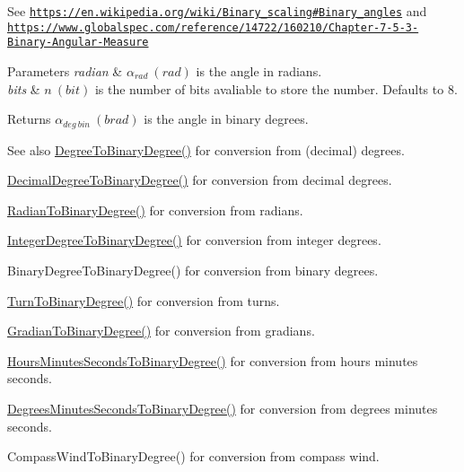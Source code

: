 See \href{https://en.wikipedia.org/wiki/Binary_scaling#Binary_angles}{\tt https\+://en.\+wikipedia.\+org/wiki/\+Binary\+\_\+scaling\#\+Binary\+\_\+angles} and \href{https://www.globalspec.com/reference/14722/160210/Chapter-7-5-3-Binary-Angular-Measure}{\tt https\+://www.\+globalspec.\+com/reference/14722/160210/\+Chapter-\/7-\/5-\/3-\/\+Binary-\/\+Angular-\/\+Measure} 
\begin{DoxyParams}{Parameters}
{\em radian} & $\alpha_{rad}\ (rad)$ is the angle in radians. \\
\hline
{\em bits} & $n\ (bit)$ is the number of bits avaliable to store the number. Defaults to 8. \\
\hline
\end{DoxyParams}
\begin{DoxyReturn}{Returns}
$\alpha_{deg\ bin}\ (brad)$ is the angle in binary degrees. 
\end{DoxyReturn}
\begin{DoxySeeAlso}{See also}
\mbox{\hyperlink{group___e_g_x_math-_angle_conversions-_degree_gacd1e3dc5194e89426a899a7cac4874f8}{Degree\+To\+Binary\+Degree()}} for conversion from (decimal) degrees. 

\mbox{\hyperlink{group___e_g_x_math-_angle_conversions-_decimal_degree_gaceec7ae7988c7f342d0b0fa6940720a1}{Decimal\+Degree\+To\+Binary\+Degree()}} for conversion from decimal degrees. 

\mbox{\hyperlink{group___e_g_x_math-_angle_conversions-_radian_ga13311d9b6977d514f1d6c336e7c0162b}{Radian\+To\+Binary\+Degree()}} for conversion from radians. 

\mbox{\hyperlink{group___e_g_x_math-_angle_conversions-_integer_degree_ga694bbfe624c3c14e97ce6155ca9bc44d}{Integer\+Degree\+To\+Binary\+Degree()}} for conversion from integer degrees. 

Binary\+Degree\+To\+Binary\+Degree() for conversion from binary degrees. 

\mbox{\hyperlink{group___e_g_x_math-_angle_conversions-_turn_ga678efb8f5c3958351fc3f1dfaf117b28}{Turn\+To\+Binary\+Degree()}} for conversion from turns. 

\mbox{\hyperlink{group___e_g_x_math-_angle_conversions-_gradian_ga6bf31920148bfd61f1f06eb961c3f62b}{Gradian\+To\+Binary\+Degree()}} for conversion from gradians. 

\mbox{\hyperlink{group___e_g_x_math-_angle_conversions-_hours_minutes_seconds_ga962a367fd21f0047eb0a7116a59c2bfc}{Hours\+Minutes\+Seconds\+To\+Binary\+Degree()}} for conversion from hours minutes seconds. 

\mbox{\hyperlink{group___e_g_x_math-_angle_conversions-_degrees_minutes_seconds_ga838c47916ce872cab2dfecd5ccf0a6ee}{Degrees\+Minutes\+Seconds\+To\+Binary\+Degree()}} for conversion from degrees minutes seconds. 

Compass\+Wind\+To\+Binary\+Degree() for conversion from compass wind. 
\end{DoxySeeAlso}
\mbox{\label{group___e_g_x_math-_angle_conversions-_radian_ga4d845b171148481aa7e85018d6dad035}} 
